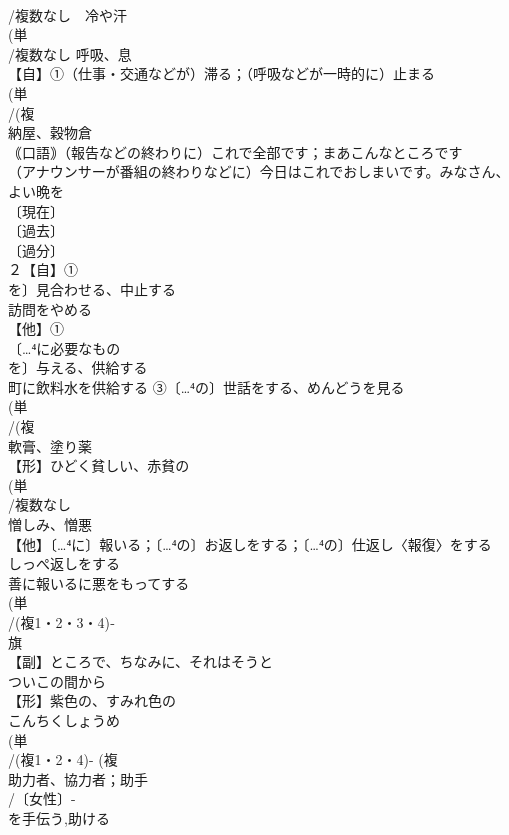 \documentclass[8pt]{extreport}
\begin{document}
\begin{CJK}{UTF8}{min}
\\	/複数なし　冷や汗 
\\	(単
\\	/複数なし 呼吸、息 
\\	【自】①（仕事・交通などが）滞る；（呼吸などが一時的に）止まる
\\	(単
\\	/(複
\\	納屋、穀物倉 
\\	｟口語｠（報告などの終わりに）これで全部です；まあこんなところです　
\\	（アナウンサーが番組の終わりなどに）今日はこれでおしまいです。みなさん、よい晩を
\\	〔現在〕
\\	〔過去〕
\\	〔過分〕
\\	２【自】①
\\	を〕見合わせる、中止する 
\\	訪問をやめる
\\	【他】①
\\	〔…⁴に必要なもの
\\	を〕与える、供給する 
\\	町に飲料水を供給する ③〔…⁴の〕世話をする、めんどうを見る
\\	(単
\\	/(複
\\	軟膏、塗り薬 
\\	【形】ひどく貧しい、赤貧の 
\\	(単
\\	/複数なし 
\\	憎しみ、憎悪 
\\	【他】〔…⁴に〕報いる；〔…⁴の〕お返しをする；〔…⁴の〕仕返し〈報復〉をする 
\\	しっぺ返しをする 
\\	善に報いるに悪をもってする
\\	(単
\\	/(複1・2・3・4)‐
\\	旗 
\\	【副】ところで、ちなみに、それはそうと 
\\	ついこの間から
\\	【形】紫色の、すみれ色の 
\\	こんちくしょうめ
\\	(単
\\	/(複1・2・4)- (複
\\	助力者、協力者；助手 
\\	/〔女性〕-
\\	を手伝う,助ける

\end{CJK}
\end{document}
